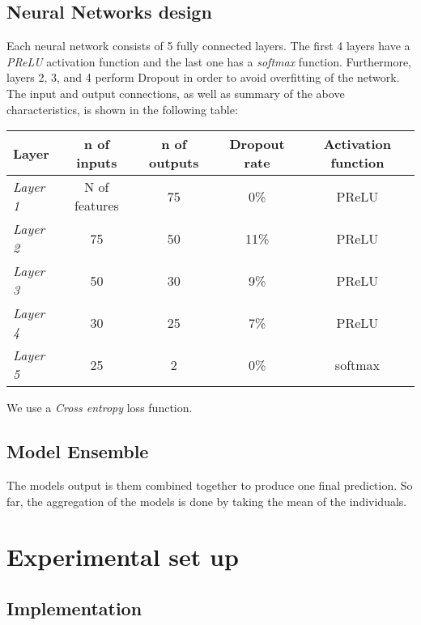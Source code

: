 \documentclass[conference]{IEEEtran}
\begin{document}
\subsection{Neural Networks design}
\label{sec:NN_design}
Each neural network consists of 5 fully connected layers. The first 4 layers have a \textit{PReLU} activation function and the last one has a \textit{softmax} function. Furthermore, layers 2, 3, and 4 perform Dropout in order to avoid overfitting of the network. The input and output connections, as well as summary of the above characteristics, is shown in the following table:

\begin{center}
	\begin{tabular}{| l | c | c | c | c |}
		\hline
		\textbf{Layer} & \textbf{n of inputs} & \textbf{n of outputs} & \textbf{Dropout rate} & \textbf{Activation function} \\ \hline
		\textit{Layer 1} & N of features & 75 & 0\% & PReLU \\ \hline
		\textit{Layer 2} & 75 & 50 & 11\% & PReLU \\ \hline
		\textit{Layer 3} & 50 & 30 & 9\% & PReLU \\ \hline
		\textit{Layer 4} & 30 & 25 & 7\% & PReLU \\ \hline
		\textit{Layer 5} & 25 & 2 & 0\% & softmax \\ \hline
	\end{tabular}
\end{center}

We use a \textit{Cross entropy} loss function. 

\subsection{Model Ensemble}
The models output is them combined together to produce one final prediction. So far, the aggregation of the models is done by taking the mean of the individuals. 


\section{Experimental set up}
\label{sec:experiment}

\subsection{Implementation}
\label{sec:implementation}
\end{document}

